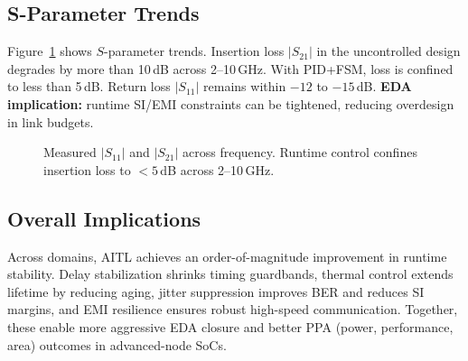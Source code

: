 \documentclass[conference]{IEEEtran}
\begin{document}
\subsection{S-Parameter Trends}
Figure~\ref{fig:sparam} shows $S$-parameter trends. Insertion loss $|S_{21}|$ in the uncontrolled design degrades by more than 10\,dB across 2--10\,GHz. With PID+FSM, loss is confined to less than 5\,dB. Return loss $|S_{11}|$ remains within $-12$ to $-15$\,dB.  
\textbf{EDA implication:} runtime SI/EMI constraints can be tightened, reducing overdesign in link budgets.

\begin{figure}[t]
\centering
{}
\caption{Measured $|S_{11}|$ and $|S_{21}|$ across frequency. Runtime control confines insertion loss to $<5$\,dB across 2--10\,GHz.}
\label{fig:sparam}
\end{figure}

\subsection{Overall Implications}
Across domains, AITL achieves an order-of-magnitude improvement in runtime stability. Delay stabilization shrinks timing guardbands, thermal control extends lifetime by reducing aging, jitter suppression improves BER and reduces SI margins, and EMI resilience ensures robust high-speed communication. Together, these enable more aggressive EDA closure and better PPA (power, performance, area) outcomes in advanced-node SoCs.
\end{document}
